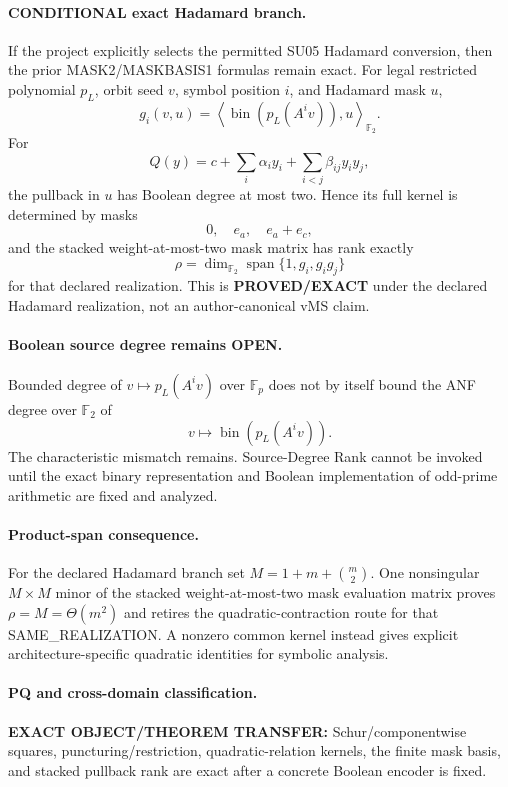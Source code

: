 \documentclass[11pt]{article}
\begin{document}
\paragraph{CONDITIONAL exact Hadamard branch.}
If the project explicitly selects the permitted SU05 Hadamard conversion, then the prior MASK2/MASKBASIS1 formulas remain exact. For legal restricted polynomial $p_L$, orbit seed $v$, symbol position $i$, and Hadamard mask $u$,
\[
\boxed{g_i(v,u)=\left\langle\operatorname{bin}\!\left(p_L(A^iv)\right),u\right\rangle_{\mathbb F_2}.}
\]
For
\[
Q(y)=c+\sum_i\alpha_i y_i+\sum_{i<j}\beta_{ij}y_iy_j,
\]
the pullback in $u$ has Boolean degree at most two. Hence its full kernel is determined by masks
\[
0,\quad e_a,\quad e_a+e_c,
\]
and the stacked weight-at-most-two mask matrix has rank exactly
\[
\rho=\dim_{\mathbb F_2}\operatorname{span}\{1,g_i,g_ig_j\}
\]
for that declared realization. This is \textbf{PROVED/EXACT} under the declared Hadamard realization, not an author-canonical vMS claim.

\paragraph{Boolean source degree remains OPEN.}
Bounded degree of $v\mapsto p_L(A^iv)$ over $\mathbb F_p$ does not by itself bound the ANF degree over $\mathbb F_2$ of
\[
v\mapsto\operatorname{bin}(p_L(A^iv)).
\]
The characteristic mismatch remains. Source-Degree Rank cannot be invoked until the exact binary representation and Boolean implementation of odd-prime arithmetic are fixed and analyzed.

\paragraph{Product-span consequence.}
For the declared Hadamard branch set $M=1+m+\binom m2$. One nonsingular $M\times M$ minor of the stacked weight-at-most-two mask evaluation matrix proves $\rho=M=\Theta(m^2)$ and retires the quadratic-contraction route for that SAME\_REALIZATION. A nonzero common kernel instead gives explicit architecture-specific quadratic identities for symbolic analysis.

\paragraph{PQ and cross-domain classification.}
\textbf{EXACT OBJECT/THEOREM TRANSFER:} Schur/componentwise squares, puncturing/restriction, quadratic-relation kernels, the finite mask basis, and stacked pullback rank are exact after a concrete Boolean encoder is fixed.
\end{document}
